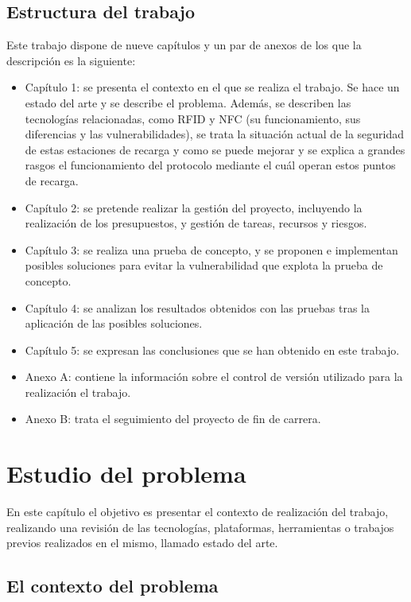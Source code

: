 \documentclass[12pt,a4paper,onecolumn,oneside]{report}
\begin{document}
\section*{Estructura del trabajo}

Este trabajo dispone de nueve capítulos y un par de anexos de los que la descripción es la siguiente:
\begin{itemize}
\item Capítulo 1: se presenta el contexto en el que se realiza el trabajo. Se hace un estado del arte y se describe el problema. Además, se describen las tecnologías relacionadas, como RFID y NFC (su funcionamiento, sus diferencias y las vulnerabilidades), se trata la situación actual de la seguridad de estas estaciones de recarga y como se puede mejorar y se explica a grandes rasgos el funcionamiento del protocolo mediante el cuál operan estos puntos de recarga.
\item Capítulo 2: se pretende realizar la gestión del proyecto, incluyendo la realización de los presupuestos, y gestión de tareas, recursos y riesgos.
\item Capítulo 3: se realiza una prueba de concepto, y se proponen e implementan posibles soluciones para evitar la vulnerabilidad que explota la prueba de concepto.
\item Capítulo 4: se analizan los resultados obtenidos con las pruebas tras la aplicación de las posibles soluciones.
\item Capítulo 5: se expresan las conclusiones que se han obtenido en este trabajo.
\item Anexo A: contiene la información sobre el control de versión utilizado para la realización el trabajo.
\item Anexo B: trata el seguimiento del proyecto de fin de carrera.


\end{itemize}


\chapter{Estudio del problema}
\label{Estudio del problema}

En este capítulo el objetivo es presentar el contexto de realización del trabajo, realizando una revisión de las tecnologías, plataformas, herramientas o trabajos previos realizados en el mismo, llamado estado del arte.

\section{El contexto del problema}
\end{document}
